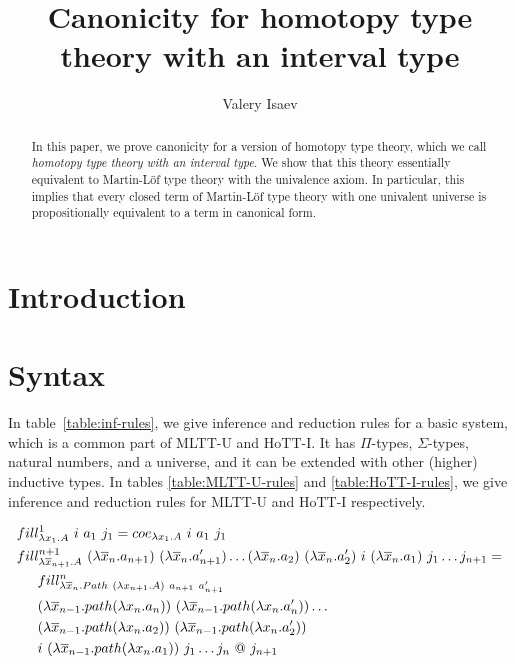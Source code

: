 \documentclass{amsart}
\theoremstyle{definition}
\theoremstyle{remark}
\numberwithin{figure}{section}
\begin{document}
\title{Canonicity for homotopy type theory with an interval type}

\author{Valery Isaev}

\begin{abstract}
In this paper, we prove canonicity for a version of homotopy type theory, which we call \emph{homotopy type theory with an interval type}.
We show that this theory essentially equivalent to Martin-L\"{o}f type theory with the univalence axiom.
In particular, this implies that every closed term of Martin-L\"{o}f type theory with one univalent universe is propositionally equivalent to a term in canonical form.
\end{abstract}

\maketitle

\section{Introduction}

\section{Syntax}

In table~\ref{table:inf-rules}, we give inference and reduction rules for a basic system, which is a common part of MLTT-U and HoTT-I.
It has $\Pi$-types, $\Sigma$-types, natural numbers, and a universe, and it can be extended with other (higher) inductive types.
In tables \ref{table:MLTT-U-rules} and \ref{table:HoTT-I-rules}, we give inference and reduction rules for MLTT-U and HoTT-I respectively.

\begin{align*}
& fill^1_{\lambda x_1. A}\ i\ a_1\ j_1 = coe_{\lambda x_1. A}\ i\ a_1\ j_1 \\
& fill^{n+1}_{\lambda \overline{x}_{n+1}. A}\ (\lambda \overline{x}_n. a_{n+1})\ (\lambda \overline{x}_n. a'_{n+1}) \ldots (\lambda \overline{x}_n. a_2)\ (\lambda \overline{x}_n. a'_2)\ i\ (\lambda \overline{x}_n. a_1)\ j_1 \ldots j_{n+1} = \\
& \indent fill^n_{\lambda \overline{x}_n. Path\ (\lambda x_{n+1}. A)\ a_{n+1}\ a'_{n+1}} \\
& \indent (\lambda \overline{x}_{n-1}. path (\lambda x_n. a_n))\ (\lambda \overline{x}_{n-1}. path (\lambda x_n. a'_n)) \ldots \\
& \indent (\lambda \overline{x}_{n-1}. path (\lambda x_n. a_2))\ (\lambda \overline{x}_{n-1}. path (\lambda x_n. a'_2)) \\
& \indent i\ (\lambda \overline{x}_{n-1}. path (\lambda x_n. a_1))\ j_1 \ldots j_n\ @\ j_{n+1}
\end{align*}
\end{document}
